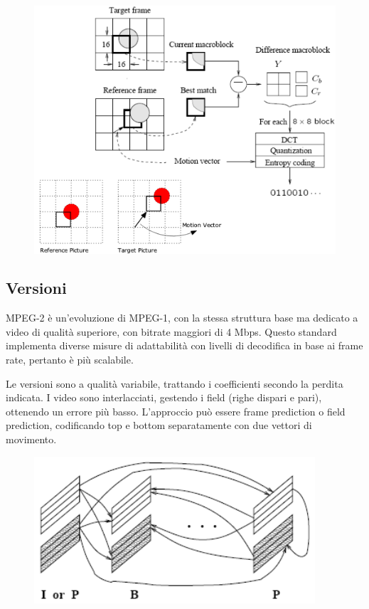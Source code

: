 \begin{figure}[h]
	\centering
	\includegraphics[scale=0.7]{Lezioni/Immagini/p-frame}
\end{figure}

\subsection{Versioni}
MPEG-2 è un'evoluzione di MPEG-1, con la stessa struttura base ma dedicato a video di qualità superiore, con bitrate maggiori di 4 Mbps. Questo standard implementa diverse misure di adattabilità con livelli di decodifica in base ai frame rate, pertanto è più scalabile.

Le versioni sono a qualità variabile, trattando i coefficienti secondo la perdita indicata. I video sono interlacciati, gestendo i field (righe dispari e pari), ottenendo un errore più basso. L'approccio può essere frame prediction o field prediction, codificando top e bottom separatamente con due vettori di movimento.

\begin{figure}[h]
	\centering
	\includegraphics[scale=0.7]{Lezioni/Immagini/ipbp}
\end{figure}

